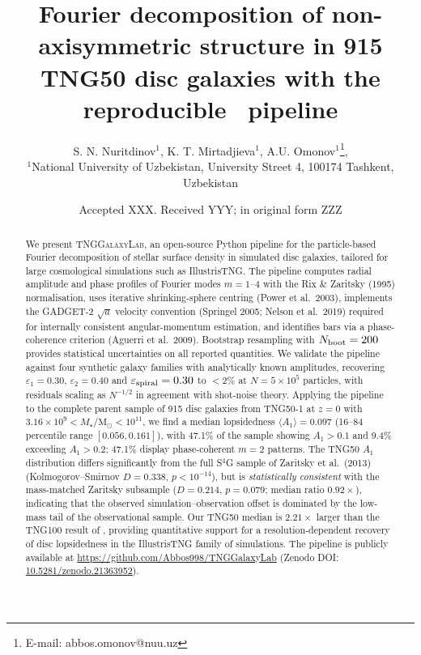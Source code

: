 \documentclass[fleqn,usenatbib]{mnras}
\title[Fourier decomposition of TNG50 disc galaxies]{%
  Fourier decomposition of non-axisymmetric structure in 915
  TNG50 disc galaxies with the reproducible \pipeline\ pipeline}
\author[S. N. Nuritdinov et al.]{%
    S. N. Nuritdinov$^{1}$, K. T. Mirtadjieva$^{1}$, A.U. Omonov$^{1}$\thanks{E-mail: abbos.omonov@nuu.uz}\orcidlink{0000-0000-0000-0000},\\
  $^{1}$National University of Uzbekistan, University Street 4,
  100174 Tashkent, Uzbekistan
}
\date{Accepted XXX. Received YYY; in original form ZZZ}
\newcommand{\Am}[1]{A_{#1}}
\newcommand{\Msun}{\mathrm{M}_{\odot}}
\newcommand{\Nboot}{N_{\rm boot}}
\newcommand{\Amone}{\ensuremath{\Am{1}}}
\newcommand{\pipeline}{\textsc{TNGGalaxyLab}}
\begin{document}
\label{firstpage}
\maketitle

\begin{abstract}
We present \pipeline, an open-source Python pipeline for the
particle-based Fourier decomposition of stellar surface density in
simulated disc galaxies, tailored for large cosmological simulations
such as IllustrisTNG.  The pipeline computes radial amplitude and
phase profiles of Fourier modes $m=1$--4 with the Rix \& Zaritsky
(1995) normalisation, uses iterative shrinking-sphere centring
(Power et al.\ 2003), implements the GADGET-2 $\sqrt{a}$ velocity
convention (Springel 2005; Nelson et al.\ 2019) required for
internally consistent angular-momentum estimation, and identifies bars via a phase-coherence criterion
(Aguerri et al.\ 2009).  Bootstrap resampling with $\Nboot = 200$
provides statistical uncertainties on all reported quantities.
We validate the pipeline against four synthetic galaxy families
with analytically known amplitudes, recovering
$\varepsilon_1 = 0.30$, $\varepsilon_2 = 0.40$ and
$\varepsilon_{\rm spiral} = 0.30$ to $<2\%$ at
$N = 5\times10^5$ particles, with residuals scaling as $N^{-1/2}$
in agreement with shot-noise theory.
Applying the pipeline to the complete parent sample of 915 disc
galaxies from TNG50-1 at $z=0$ with $3.16\times10^9 < M_\star /
\Msun < 10^{11}$, we find a median lopsidedness $\langle \Amone
\rangle = 0.097$ (16--84 percentile range $[0.056, 0.161]$), with
47.1\% of the sample showing $\Amone > 0.1$ and 9.4\% exceeding
$\Amone > 0.2$; 47.1\% display phase-coherent $m=2$ patterns.
The TNG50 $\Amone$ distribution differs significantly from the
full S$^{4}$G sample of Zaritsky et al.\ (2013) (Kolmogorov--Smirnov
$D = 0.338$, $p < 10^{-14}$), but is \emph{statistically consistent}
with the mass-matched Zaritsky subsample ($D = 0.214$, $p = 0.079$;
median ratio $0.92\times$), indicating that the observed
simulation--observation offset is dominated by the low-mass tail
of the observational sample.  Our TNG50 median is $2.21\times$
larger than the TNG100 result of \citet{2022A&A...662A..53L}, providing
quantitative support for a resolution-dependent recovery of disc
lopsidedness in the IllustrisTNG family of simulations.
The pipeline is publicly available at
\url{https://github.com/Abbos998/TNGGalaxyLab}
(Zenodo DOI: \href{https://doi.org/10.5281/zenodo.21363952}{10.5281/zenodo.21363952}).
\end{abstract}
\end{document}

